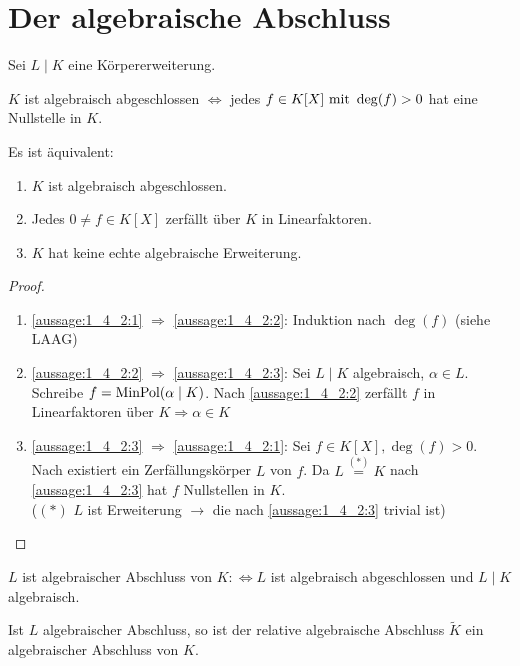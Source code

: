 \section{Der algebraische Abschluss}
Sei $L\mid K$ eine Körpererweiterung.
\begin{definition}
	$K$ ist algebraisch abgeschlossen $\Longleftrightarrow$ jedes $f \in K[X] \mit \deg(f) > 0$ hat eine Nullstelle in $K$.
\end{definition}
\begin{lemma}
	Es ist äquivalent:
	\begin{enumerate}
		\item $K$ ist algebraisch abgeschlossen. \label{aussage:1_4_2:1}
		\item Jedes $0 \neq f \in K[X]$ zerfällt über $K$ in Linearfaktoren. \label{aussage:1_4_2:2}
		\item $K$ hat keine echte algebraische Erweiterung. \label{aussage:1_4_2:3}
	\end{enumerate}
\end{lemma}
\begin{proof} %
	\begin{enumerate}[label=]
		\item \ref{aussage:1_4_2:1} $\Rightarrow$ \ref{aussage:1_4_2:2}: Induktion nach $\deg(f)$ (siehe LAAG)
		\item \ref{aussage:1_4_2:2} $\Rightarrow$ \ref{aussage:1_4_2:3}: Sei $L \mid K$ algebraisch, $\alpha \in L$. Schreibe $f = \MinPol(\alpha \mid K)$. Nach \ref{aussage:1_4_2:2} zerfällt $f$ in Linearfaktoren über $K \Rightarrow \alpha \in K$
		\item \ref{aussage:1_4_2:3} $\Rightarrow$ \ref{aussage:1_4_2:1}: Sei $f \in K[X], \deg(f) > 0$. Nach  existiert ein Zerfällungskörper $L$ von $f$. Da $L\overset{(*)}{=}K$ nach \ref{aussage:1_4_2:3} hat $f$ Nullstellen in $K$. \\
		($(*)$ $L$ ist Erweiterung $\rightarrow$ die nach \ref{aussage:1_4_2:3} trivial ist)
	\end{enumerate}
\end{proof}
\begin{definition}
	$L$ ist algebraischer Abschluss von $K :\Longleftrightarrow L$ ist algebraisch abgeschlossen und $L\mid K$ algebraisch.
\end{definition}
\begin{lemma}
	Ist $L$ algebraischer Abschluss, so ist der relative algebraische Abschluss $\tilde{K}$ ein algebraischer Abschluss von $K$.
\end{lemma}
